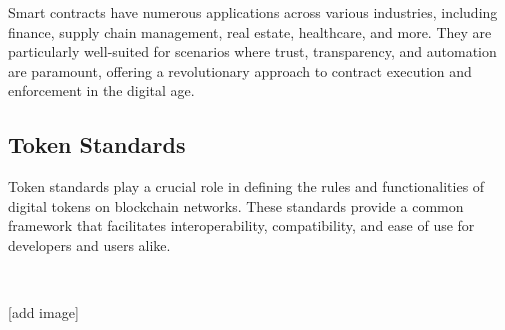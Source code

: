Smart contracts have numerous applications across various industries, including finance, supply chain management, real estate, healthcare, and more. They are particularly well-suited for scenarios where trust, transparency, and automation are paramount, offering a revolutionary approach to contract execution and enforcement in the digital age.

\subsection{Token Standards}
\label{subsec:token_standards}

Token standards play a crucial role in defining the rules and functionalities of digital tokens on blockchain networks. These standards provide a common framework that facilitates interoperability, compatibility, and ease of use for developers and users alike.

~

[add image]

~

